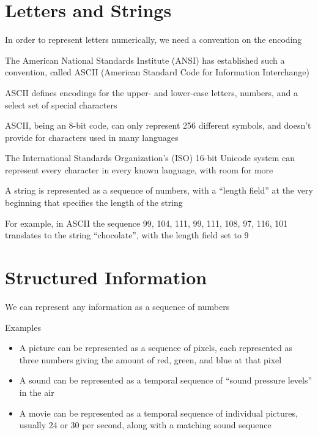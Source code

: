 \documentclass[8pt,a4paper,compress]{beamer}
\begin{document}
\section{Letters and Strings}
\begin{frame}[fragile]
\pause

In order to represent letters numerically, we need a convention on the encoding

\pause
\bigskip

The American National Standards Institute (ANSI) has established such a convention, called ASCII (American Standard Code for Information Interchange)

\pause
\bigskip

ASCII defines encodings for the upper- and lower-case letters, numbers, and a select set of special characters

\pause
\bigskip

ASCII, being an 8-bit code, can only represent 256 different symbols, and doesn't provide for characters used in many languages

\pause
\bigskip

The International Standards Organization's (ISO) 16-bit Unicode system can represent every character in every known language, with room for more
\end{frame}

\begin{frame}[fragile]
\pause

A string is represented as a sequence of numbers, with a ``length field'' at the very beginning that specifies the length of the string

\pause
\bigskip

For example, in ASCII the sequence 99, 104, 111, 99, 111, 108, 97, 116, 101 translates to the string ``chocolate'', with the length field set to 9
\end{frame}

\section{Structured Information}
\begin{frame}[fragile]
\pause

We can represent any information as a sequence of numbers

\pause
\bigskip

Examples
\begin{itemize}
\item A picture can be represented as a sequence of pixels, each represented as three numbers giving the amount of red, green, and blue at that pixel

\item A sound can be represented as a temporal sequence of ``sound pressure levels'' in the air

\item A movie can be represented as a temporal sequence of individual pictures, usually 24 or 30 per second, along with a matching sound sequence
\end{itemize}
\end{frame}
\end{document}
